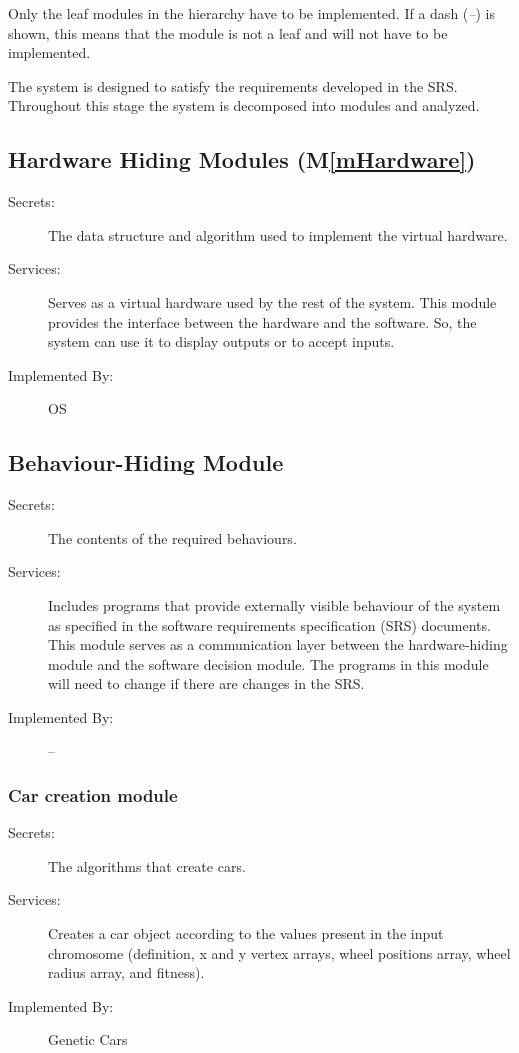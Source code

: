 \documentclass[12pt, titlepage]{article}
\newcommand{\mref}[1]{M\ref{#1}}
\begin{document}
Only the leaf modules in the
hierarchy have to be implemented. If a dash (\emph{--}) is shown, this means
that the module is not a leaf and will not have to be implemented. 

The system is designed to satisfy the requirements developed in the SRS. 
Throughout
this stage the system is decomposed into modules and analyzed.

\subsection{Hardware Hiding Modules (\mref{mHardware})}

\begin{description}
\item[Secrets:]The data structure and algorithm used to implement the virtual
  hardware.
\item[Services:]Serves as a virtual hardware used by the rest of the
  system. This module provides the interface between the hardware and the
  software. So, the system can use it to display outputs or to accept inputs.
\item[Implemented By:] OS
\end{description}

\subsection{Behaviour-Hiding Module}

\begin{description}
\item[Secrets:]The contents of the required behaviours.
\item[Services:]Includes programs that provide externally visible behaviour of
  the system as specified in the software requirements specification (SRS)
  documents. This module serves as a communication layer between the
  hardware-hiding module and the software decision module. The programs in this
  module will need to change if there are changes in the SRS.
\item[Implemented By:] --
\end{description}

\subsubsection{Car creation module}

\begin{description}
\item[Secrets:] The algorithms that create cars.
\item[Services:] Creates a car object according to the values present in the 
input chromosome (definition, x and y vertex arrays, wheel positions array, 
wheel radius array, and fitness).
\item[Implemented By:] Genetic Cars
\end{description}
\end{document}
